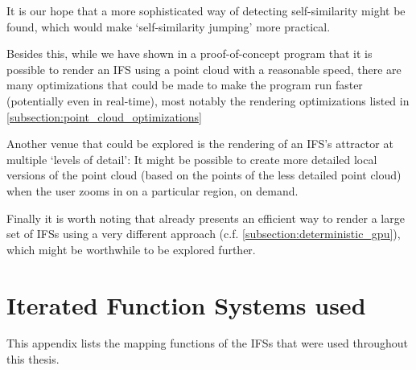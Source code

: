 \documentclass[11pt]{article}
\begin{document}
It is our hope that a more sophisticated way of detecting self-similarity might be found,
which would make `self-similarity jumping' more practical.

Besides this, while we have shown in a proof-of-concept program that it is possible to render an IFS using a point cloud
with a reasonable speed, there are many optimizations that could be made to make the program run faster (potentially even in real-time),
most notably the rendering optimizations listed in \autoref{subsection:point_cloud_optimizations}

Another venue that could be explored is the rendering of an IFS's attractor at multiple `levels of detail':
It might be possible to create more detailed local versions of the point cloud (based on the points of the less detailed point cloud) when the user
zooms in on a particular region, on demand.

Finally it is worth noting that \cite{lawlor2012gpu} already presents an efficient way to render 
a large set of IFSs using a very different approach (c.f. \autoref{subsection:deterministic_gpu}), 
which might be worthwhile to be explored further.

\pagebreak
\printbibliography
\clearpage

\appendix

\section{Iterated Function Systems used}
\label{sec:org30b64ea}

This appendix lists the mapping functions of the IFSs that were used throughout this thesis.
\end{document}
